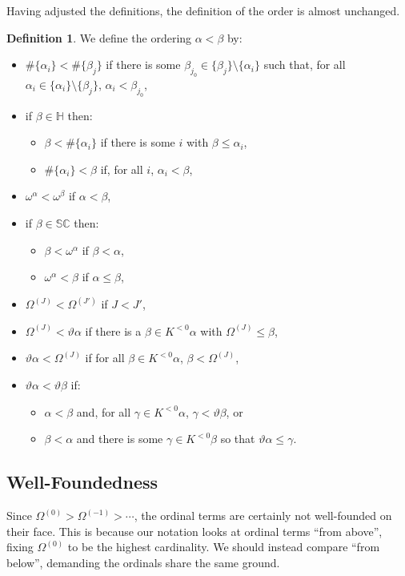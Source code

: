 \documentclass[11pt]{amsart}
\theoremstyle{definition}
\newtheorem{definition}[theorem]{Definition}
\begin{document}
Having adjusted the definitions, the definition of the order is almost unchanged.
\begin{definition}
  We define the ordering $\alpha<\beta$ by:
  \begin{itemize}
\item $\#\{\alpha_i\}<\#\{\beta_j\}$ if there is some $\beta_{j_0}\in\{\beta_j\}\setminus\{\alpha_i\}$ such that, for all $\alpha_i\in\{\alpha_i\}\setminus\{\beta_j\}$, $\alpha_i<\beta_{j_0}$,
\item if $\beta\in\mathbb{H}$ then:
  \begin{itemize}
  \item $\beta<\#\{\alpha_i\}$ if there is some $i$ with $\beta\leq\alpha_i$,
  \item $\#\{\alpha_i\}<\beta$ if, for all $i$, $\alpha_i<\beta$,
  \end{itemize}
\item $\omega^\alpha<\omega^\beta$ if $\alpha<\beta$,
\item if $\beta\in\mathbb{SC}$ then:
  \begin{itemize}
  \item $\beta<\omega^\alpha$ if $\beta<\alpha$,
  \item $\omega^\alpha<\beta$ if $\alpha\leq\beta$,
  \end{itemize}
\item $\Omega^{(J)}<\Omega^{(J')}$ if $J<J'$,
\item $\Omega^{(J)}<\vartheta\alpha$ if there is a $\beta\in K^{< 0}\alpha$ with $\Omega^{(J)}\leq\beta$,
\item $\vartheta\alpha<\Omega^{(J)}$ if for all $\beta\in K^{< 0}\alpha$, $\beta<\Omega^{(J)}$,
\item $\vartheta\alpha<\vartheta\beta$ if:
  \begin{itemize}
  \item $\alpha<\beta$ and, for all $\gamma\in K^{< 0}\alpha$, $\gamma<\vartheta\beta$, or
  \item $\beta<\alpha$ and there is some $\gamma\in K^{< 0}\beta$ so that $\vartheta\alpha\leq\gamma$.
  \end{itemize}
\end{itemize}
\end{definition}

\subsection{Well-Foundedness}

Since $\Omega^{(0)}>\Omega^{(-1)}>\cdots$, the ordinal terms are certainly not well-founded on their face. This is because our notation looks at ordinal terms ``from above'', fixing $\Omega^{(0)}$ to be the highest cardinality. We should instead compare ``from below'', demanding the ordinals share the same ground.
\end{document}
